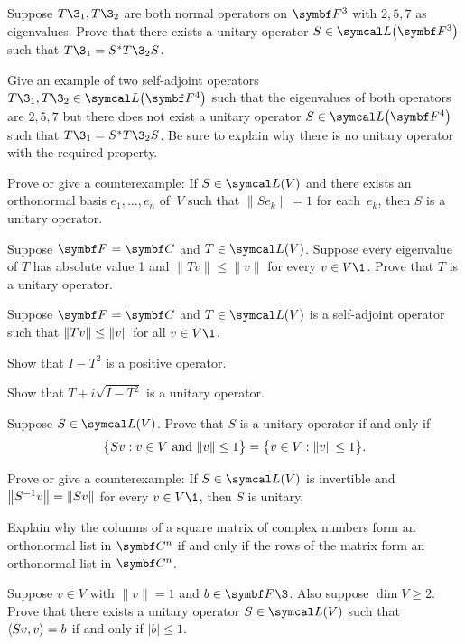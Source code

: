 \begin{exercises}
\exercise
Suppose $T\3_1, T\3_2$ are both normal operators on $\F{3}$ with $2, 5, 7$ as eigenvalues. Prove that there exists a unitary operator $S\in \L\paren[\big]{\F{3}}$ such that
$
T\3_1 = S^* T\3_2 S$.


\exercise
Give an example of two self-adjoint operators $T\3_1, T\3_2 \in \L\paren[\big]{\F{4}}$ such that the eigenvalues of both operators are $2, 5, 7$ but there does not exist a unitary operator $S\in \L\paren[\big]{\F{4}}$ such that
$T\3_1 = S^* T\3_2 S$.
Be sure to explain why there is no unitary operator with the required property.


\exercise
Prove or give a counterexample: If $S \in \L(V)$ and there exists an orthonormal basis $e_1, \dots, e_n$ of~$V$ such that $\|Se_k\| = 1$ for each~$e_k$, then $S$ is a unitary operator.


\exercise
Suppose $\F{} = \C{}$ and $T \in \L(V)$. Suppose every eigenvalue of $T$ has absolute value 1 and
$\|Tv\| \le \|v\|$ for every $v \in V\1$. Prove that $T$ is a unitary operator.


\exercise
Suppose $\F{} = \C{}$ and $T \in \L(V)$ is a self-adjoint operator such that $\norm{Tv} \le \norm{v}$ for all $v \in V\1$.
\begin{subtheorem}
\item
Show that $I - T^2$ is a positive operator.
\item
Show that $T + i \sqrt{I - T^2}$ is a unitary operator.
\end{subtheorem}
\exercisesubtheoremend


\exercise
Suppose $S \in \L(V)$. Prove that $S$ is a unitary operator if and only if \label{IsoBall}
\[
\br[\big]{ Sv : v \in V \text{ and } \norm{v} \le 1} = \br[\big]{ v \in V: \norm{v} \le 1}.
\]
\exercisedisplayend


\exercise
Prove or give a counterexample: If $S \in \L(V)$ is invertible and \mbox{$\norm[\big]{S^{-1} v} =  \norm{S v}$} for every $v \in V\1$, then $S$ is unitary.


\pagebreak[3]

\exercise
Explain why the columns of a square matrix of complex numbers form an orthonormal list in $\C{n}$ if and only if the rows of the matrix form an orthonormal list in $\C{n}$.


\exercise
Suppose $v \in V$ with $\|v\| = 1$ and $b \in \F{}\3$. Also suppose $\dim V \ge 2$. Prove that there exists a unitary operator $S \in \L(V)$ such that $\ip{Sv, v} = b$ if and only if $|b| \le 1$.



\end{exercises}
